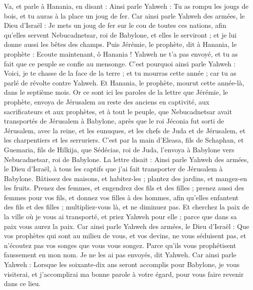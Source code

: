 \begin{multicols}{2}
Va, et parle à Hanania, en disant : Ainsi parle Yahweh : Tu as rompu les jougs de bois, et tu auras à la place un joug de fer.
Car ainsi parle Yahweh des armées, le Dieu d'Israël : Je mets un joug de fer sur le cou de toutes ces nations, afin qu'elles servent Nebucadnetsar, roi de Babylone, et elles le serviront ; et je lui donne aussi les bêtes des champs.
Puis Jérémie, le prophète, dit à Hanania, le prophète : Ecoute maintenant, ô Hanania ! Yahweh ne t'a pas envoyé, et tu as fait que ce peuple se confie au mensonge.
C'est pourquoi ainsi parle Yahweh : Voici, je te chasse de la face de la terre ; et tu mourras cette année ; car tu as parlé de révolte contre Yahweh.
Et Hanania, le prophète, mourut cette année-là, dans le septième mois.
\VerseOne{}Or ce sont ici les paroles de la lettre que Jérémie, le prophète, envoya de Jérusalem au reste des anciens en captivité, aux sacrificateurs et aux prophètes, et à tout le peuple, que Nebucadnetsar avait transportés de Jérusalem à Babylone,
après que le roi Jéconia fut sorti de Jérusalem, avec la reine, et les eunuques, et les chefs de Juda et de Jérusalem, et les charpentiers et les serruriers.
C'est par la main d'Eleasa, fils de Schaphan, et Guemaria, fils de Hilkija, que Sédécias, roi de Juda, l'envoya à Babylone vers Nebucadnetsar, roi de Babylone. La lettre disait :
Ainsi parle Yahweh des armées, le Dieu d'Israël, à tous les captifs que j'ai fait transporter de Jérusalem à Babylone.
Bâtissez des maisons, et habitez-les ; plantez des jardins, et mangez-en les fruits.
Prenez des femmes, et engendrez des fils et des filles ; prenez aussi des femmes pour vos fils, et donnez vos filles à des hommes, afin qu'elles enfantent des fils et des filles ; multipliez-vous là, et ne diminuez pas.
Et cherchez la paix de la ville où je vous ai transporté, et priez Yahweh pour elle ; parce que dans sa paix vous aurez la paix.
Car ainsi parle Yahweh des armées, le Dieu d'Israël : Que vos prophètes qui sont au milieu de vous, et vos devins, ne vous séduisent pas, et n'écoutez pas vos songes que vous vous songez.
Parce qu'ils vous prophétisent faussement en mon nom. Je ne les ai pas envoyés, dit Yahweh.
Car ainsi parle Yahweh : Lorsque les soixante-dix ans seront accomplis pour Babylone, je vous visiterai, et j'accomplirai ma bonne parole à votre égard, pour vous faire revenir dans ce lieu.

\end{multicols}
